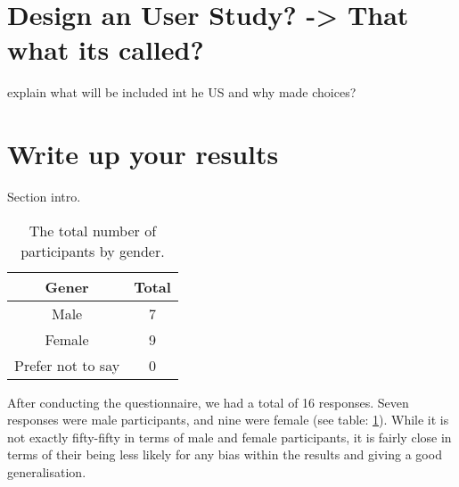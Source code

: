 \documentclass{sigchi}
\begin{document}


\section{Design an User Study? -> That what its called?}
	explain what will be included int he US and why made choices?


	


\section{Write up your results}

	Section intro.

	\begin{table}[ht]
		\centering
		\begin{tabular}[t]{|c| c |}
			\hline
			Gener & Total  \\ 
			\hline
			Male & 7 \\ 
			\hline
			Female & 9  \\ 
			\hline
			Prefer not to say &  0\\
			\hline
		\end{tabular}
		\caption{The total number of participants by gender.}
		\label{tab:gender}
	\end{table}%


	After conducting the questionnaire, we had a total of 16 responses. Seven responses were male participants, and nine were female (see table: \ref{tab:gender}). While it is not exactly fifty-fifty in terms of male and female participants, it is fairly close in terms of their being less likely for any bias within the results and giving a good generalisation. 
	
\end{document}
